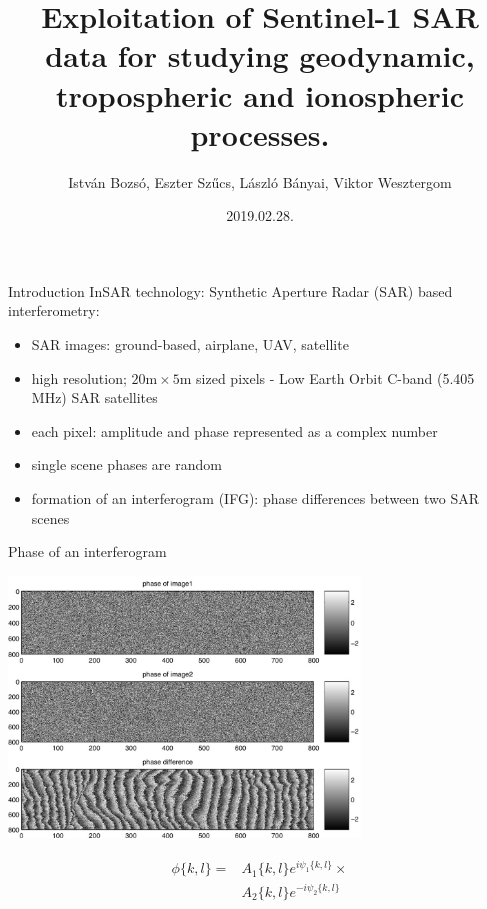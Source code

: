 \documentclass{beamer}
\title[H-SPACE, Budapest 2019]{Exploitation of Sentinel-1 SAR data for studying geodynamic, tropospheric and ionospheric processes.}
\author[Bozsó et al.]{István Bozsó, Eszter Szűcs, László Bányai, Viktor Wesztergom}
\institute[MTA CSFK GGI]{MTA CSFK Geodetic and Geophysical Institute}
\date{2019.02.28.}
\begin{document}
\begin{frame}
    \titlepage
\end{frame}

\begin{frame}{Introduction}
    InSAR technology: Synthetic Aperture Radar (SAR) based interferometry:
    \begin{itemize}
        \item SAR images: ground-based, airplane, UAV, satellite
        \item high resolution; $20 \mathrm{m} \times 5 \mathrm{m}$ sized pixels - Low Earth Orbit C-band (5.405 MHz) SAR satellites
        \item each pixel: amplitude and phase represented as a complex number
        \item single scene phases are random
        \item formation of an interferogram (IFG): phase differences between two SAR scenes
    \end{itemize}
\end{frame}


\begin{frame}{Phase of an interferogram}
    \begin{center}
        \includegraphics[width=0.7\textwidth]{insar_phase.png}
        
        \begin{align*}
            \phi\{k,l\} = & A_1\{k,l\} e^{i\psi_1\{k,l\}} \times \\
                          & A_2\{k,l\} e^{-i\psi_2\{k,l\}}
        \end{align*}
    \end{center}
\end{frame}
\end{document}
